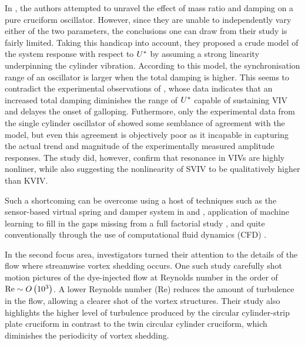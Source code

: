 \documentclass[oneside]{utmthesis}
\begin{document}
In \citet{Nguyen2012}, the authors attempted to unravel the effect of mass ratio and damping on a pure cruciform oscillator. However, since they are unable to independently vary either of the two parameters, the conclusions one can draw from their study is fairly limited. Taking this handicap into account, they proposed a crude model of the system response with respect to $U^{*}$ by assuming a strong linearity underpinning the cylinder vibration. According to this model, the synchronisation range of an oscillator is larger when the total damping is higher. This seems to contradict the experimental observations of \citet{Sun2016}, whose data indicates that an increased total damping diminishes the range of $U^{*}$ capable of sustaining VIV and delayes the onset of galloping. Futhermore, only the experimental data from the single cylinder oscillator of \citet{Nguyen2012} showed some semblance of agreement with the model, but even this agreement is objectively poor as it incapable in capturing the actual trend and magnitude of the experimentally measured amplitude responses. The study did, however, confirm that resonance in VIVs are highly nonliner, while also suggesting the nonlinearity of SVIV to be qualitatively higher than KVIV. 

Such a shortcoming can be overcome using a host of techniques such as the sensor-based virtual spring and damper system in \citet{Garcia2018} and \citet{Sun2018}, application of machine learning to fill in the gaps missing from a full factorial study \citep{Hu2020}, and quite conventionally through the use of computational fluid dynamics (CFD) \citep{Zhang2018a}.

In the second focus area, investigators turned their attention to the details of the flow where streamwise vortex shedding occurs. One such study carefully shot motion pictures of the dye-injected flow \citep{Koide2017} at Reynolds number in the order of $\text{Re} \sim O\left( 10^{3} \right)$. A lower Reynolds number (Re) reduces the amount of turbulence in the flow, allowing a clearer shot of the vortex structures. Their study also highlights the higher level of turbulence produced by the circular cylinder-strip plate cruciform in contrast to the twin circular cylinder cruciform, which diminishes the periodicity of vortex shedding.
\end{document}
